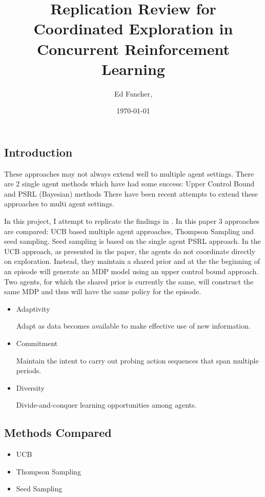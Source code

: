 \documentclass[final]{beamer}
\title
[CS234 Poster Session] %
{ %
Replication Review for Coordinated Exploration in
Concurrent Reinforcement Learning
}
\author{ %
Ed Fancher\inst{1}, 
}
\institute
[Stanford University] %
{
\inst{1} Department of Computer Science Stanford University, Stanford, California
}
\date{\today}
\begin{document}
\begin{frame}[t]
\begin{multicols}{3}

\section{Introduction}
These approaches may not always extend well to multiple agent settings. There are 2 single agent methods which have had some success: Upper Control Bound \cite{UCB2010} and PSRL (Bayesian) methods \cite{Strens2000} There have been recent attempts to extend these approaches to multi agent settings.

In this project, I attempt to replicate the findings in \cite{SeedSampling}. In this paper 3 approaches are compared: UCB based multiple agent approaches, Thompson Sampling and seed sampling. Seed sampling is based on the single agent PSRL approach.  In the UCB approach, as presented in the paper, the agents do not coordinate directly on exploration. Instead, they maintain a shared prior  and at the the beginning of an episode will generate an MDP model using an upper control bound approach.  Two agents, for which the shared prior is currently the same, will construct the same MDP and thus will have the same policy for the episode.

\begin{itemize}
\item Adaptivity

Adapt as data becomes available to make effective use of new
information.

\item Commitment

Maintain the intent to carry out probing action sequences
that span multiple periods.

\item Diversity

Divide-and-conquer learning opportunities among agents.

\end{itemize}

\subsection{Methods Compared}
\begin{itemize}
\item UCB
\item Thompson Sampling
\item Seed Sampling
\end{itemize}


\end{multicols}
\end{frame}
\end{document}
